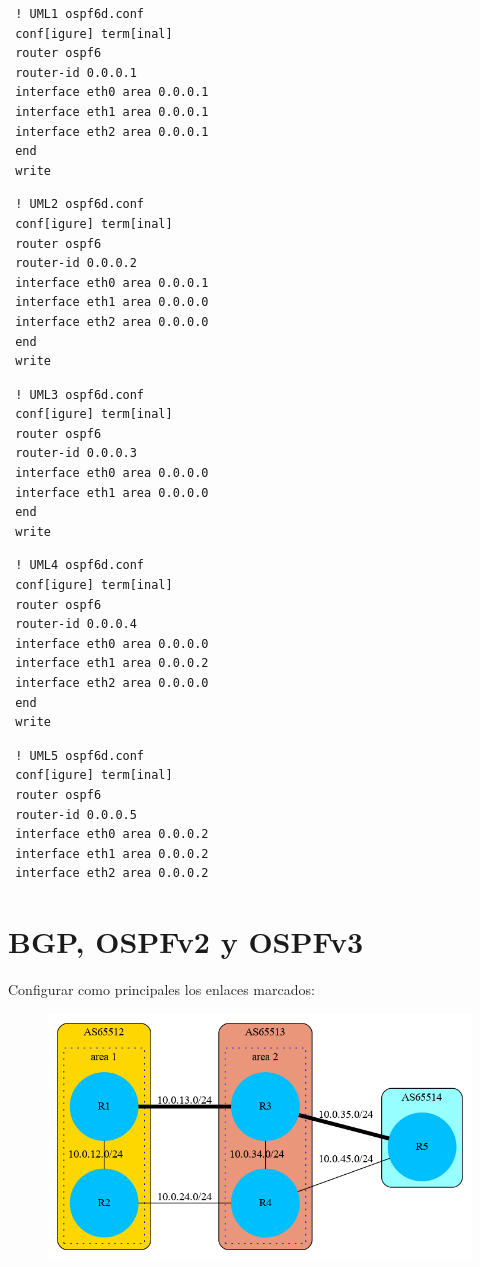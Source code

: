 \documentclass{article}
\begin{document}
\begin{verbatim}
 ! UML1 ospf6d.conf
 conf[igure] term[inal]
 router ospf6
 router-id 0.0.0.1
 interface eth0 area 0.0.0.1
 interface eth1 area 0.0.0.1
 interface eth2 area 0.0.0.1
 end
 write
\end{verbatim}

\begin{verbatim}
 ! UML2 ospf6d.conf
 conf[igure] term[inal]
 router ospf6
 router-id 0.0.0.2
 interface eth0 area 0.0.0.1
 interface eth1 area 0.0.0.0
 interface eth2 area 0.0.0.0
 end
 write
\end{verbatim}

\begin{verbatim}
 ! UML3 ospf6d.conf
 conf[igure] term[inal]
 router ospf6
 router-id 0.0.0.3
 interface eth0 area 0.0.0.0
 interface eth1 area 0.0.0.0
 end
 write
\end{verbatim}

\begin{verbatim}
 ! UML4 ospf6d.conf
 conf[igure] term[inal]
 router ospf6
 router-id 0.0.0.4
 interface eth0 area 0.0.0.0
 interface eth1 area 0.0.0.2
 interface eth2 area 0.0.0.0
 end
 write
\end{verbatim}

\begin{verbatim}
 ! UML5 ospf6d.conf
 conf[igure] term[inal]
 router ospf6
 router-id 0.0.0.5
 interface eth0 area 0.0.0.2
 interface eth1 area 0.0.0.2
 interface eth2 area 0.0.0.2
\end{verbatim}

\section{BGP, OSPFv2 y OSPFv3}
Configurar como principales los enlaces marcados:
\begin{figure}[h]
  \includegraphics[width=12cm]{bgp_next_hop.png}
\end{figure}
\end{document}
